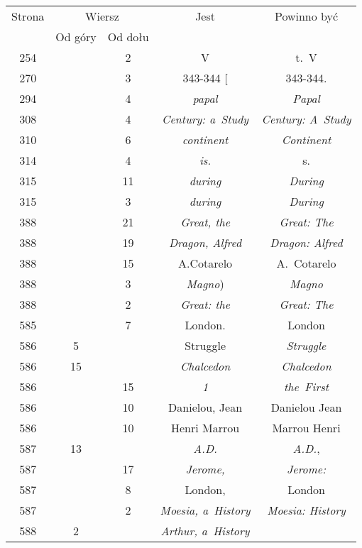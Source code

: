 \documentclass[a4paper,11pt]{article}
\numberwithin{equation}{section}
\begin{document}
\begin{center}
  \begin{tabular}{|c|c|c|c|c|}
    \hline
    Strona & \multicolumn{2}{c|}{Wiersz} & Jest
                              & Powinno być \\ \cline{2-3}
    & Od góry & Od dołu & & \\
    \hline
    254 & & \hphantom{0}2 & V & t.~V \\
    270 & & \hphantom{0}3 & 343-344 [ & 343-344. \\
    294 & & \hphantom{0}4 & \textit{papal} & \textit{Papal} \\
    308 & & \hphantom{0}4 & \textit{Century: a~Study}
    & \textit{Century: A~Study} \\
    310 & & \hphantom{0}6 & \textit{continent} & \textit{Continent} \\
    314 & & \hphantom{0}4 & \textit{is.} & s. \\
    315 & & 11 & \textit{during} & \textit{During} \\
    315 & & \hphantom{0}3 & \textit{during} & \textit{During} \\
    388 & & 21 & \textit{Great, the} & \textit{Great: The} \\
    388 & & 19 & \textit{Dragon, Alfred} & \textit{Dragon: Alfred} \\
    388 & & 15 & A.Cotarelo & A.~Cotarelo \\
    388 & & \hphantom{0}3 & \textit{Magno}) & \textit{Magno} \\
    388 & & \hphantom{0}2 & \textit{Great: the} & \textit{Great: The} \\
    585 & & \hphantom{0}7 & London. & London \\
    586 & \hphantom{0}5 & & Struggle & \textit{Struggle} \\
    586 & 15 & & \textit{Chalcedon} & \textit{Chalcedon} \\
    586 & & 15 & \textit{1} & \textit{the~First} \\
    586 & & 10 & Danielou, Jean & Danielou Jean \\
    586 & & 10 & Henri Marrou & Marrou Henri \\
    587 & 13 & & \textit{A.D.} & \textit{A.D.}, \\
    587 & & 17 & \textit{Jerome,} & \textit{Jerome:} \\
    587 & & \hphantom{0}8 & London, & London \\
    587 & & \hphantom{0}2 & \textit{Moesia, a~History}
    & \textit{Moesia: History} \\
    588 & \hphantom{0}2 & & \textit{Arthur, a~History}

\end{tabular}
\end{center}
\end{document}
